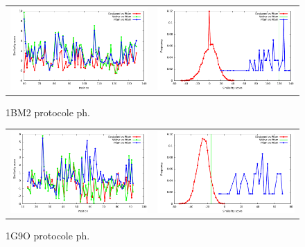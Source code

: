 \documentclass[a4paper,12pt]{article}
\begin{document}
   \begin{figure}[t]
     \centering
     \begin{tabular}{cc}
       \includegraphics[width=8.45cm]{gen_08032012/1BM2/ph/similarity_bypos.pdf} &
       \includegraphics[width=8.45cm]{gen_08032012/1BM2/ph/similarity_byseq_frequency.pdf} \\
     \end{tabular}

     \caption{1BM2 protocole ph.}
     \label{1ABO}
   \end{figure}
   \begin{figure}[t]
     \centering
     \begin{tabular}{cc}
       \includegraphics[width=8.45cm]{gen_08032012/1G9O/ph/similarity_bypos.pdf} &
       \includegraphics[width=8.45cm]{gen_08032012/1G9O/ph/similarity_byseq_frequency.pdf} \\
     \end{tabular}
     
     \caption{1G9O protocole ph.}
     \label{1ABO}
   \end{figure}
\end{document}
